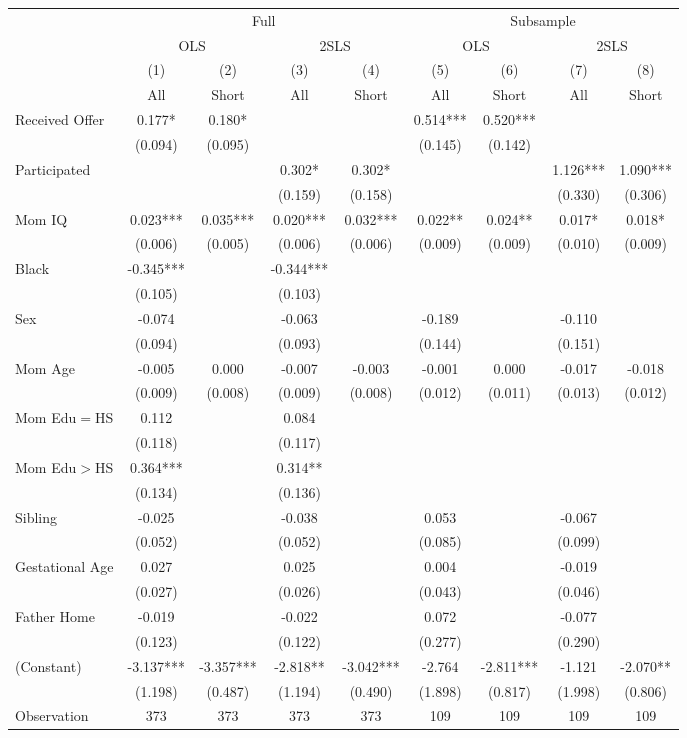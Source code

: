 \begin{tabular}{lcccccccc}
\toprule 
\midrule 
 & \multicolumn{4}{c}{Full} & \multicolumn{4}{c}{Subsample} \\
 \cmidrule(lr){2-5} \cmidrule(lr){6-9} 
 & \multicolumn{2}{c}{OLS} & \multicolumn{2}{c}{2SLS} & \multicolumn{2}{c}{OLS} & \multicolumn{2}{c}{2SLS} \\
 \cmidrule(lr){2-3} \cmidrule(lr){4-5} \cmidrule(lr){6-7} \cmidrule(lr){8-9} 
 & (1) & (2) & (3) & (4) & (5) & (6) & (7) & (8) \\
 & All & Short & All & Short & All & Short & All & Short \\
\midrule 
Received Offer & 0.177* & 0.180* &  &  & 0.514*** & 0.520*** &  &  \\
 & (0.094) & (0.095) &  &  & (0.145) & (0.142) &  &  \\
Participated &  &  & 0.302* & 0.302* &  &  & 1.126*** & 1.090*** \\
 &  &  & (0.159) & (0.158) &  &  & (0.330) & (0.306) \\
Mom IQ & 0.023*** & 0.035*** & 0.020*** & 0.032*** & 0.022** & 0.024** & 0.017* & 0.018* \\
 & (0.006) & (0.005) & (0.006) & (0.006) & (0.009) & (0.009) & (0.010) & (0.009) \\
Black & -0.345*** &  & -0.344*** &  &  &  &  &  \\
 & (0.105) &  & (0.103) &  &  &  &  &  \\
Sex & -0.074 &  & -0.063 &  & -0.189 &  & -0.110 &  \\
 & (0.094) &  & (0.093) &  & (0.144) &  & (0.151) &  \\
Mom Age & -0.005 & 0.000 & -0.007 & -0.003 & -0.001 & 0.000 & -0.017 & -0.018 \\
 & (0.009) & (0.008) & (0.009) & (0.008) & (0.012) & (0.011) & (0.013) & (0.012) \\
Mom Edu$=$HS & 0.112 &  & 0.084 &  &  &  &  &  \\
 & (0.118) &  & (0.117) &  &  &  &  &  \\
Mom Edu$>$HS & 0.364*** &  & 0.314** &  &  &  &  &  \\
 & (0.134) &  & (0.136) &  &  &  &  &  \\
Sibling & -0.025 &  & -0.038 &  & 0.053 &  & -0.067 &  \\
 & (0.052) &  & (0.052) &  & (0.085) &  & (0.099) &  \\
Gestational Age & 0.027 &  & 0.025 &  & 0.004 &  & -0.019 &  \\
 & (0.027) &  & (0.026) &  & (0.043) &  & (0.046) &  \\
Father Home & -0.019 &  & -0.022 &  & 0.072 &  & -0.077 &  \\
 & (0.123) &  & (0.122) &  & (0.277) &  & (0.290) &  \\
(Constant) & -3.137*** & -3.357*** & -2.818** & -3.042*** & -2.764 & -2.811*** & -1.121 & -2.070** \\
 & (1.198) & (0.487) & (1.194) & (0.490) & (1.898) & (0.817) & (1.998) & (0.806) \\
\midrule 
Observation & 373 & 373 & 373 & 373 & 109 & 109 & 109 & 109 \\
\midrule 
\bottomrule 
\end{tabular}
